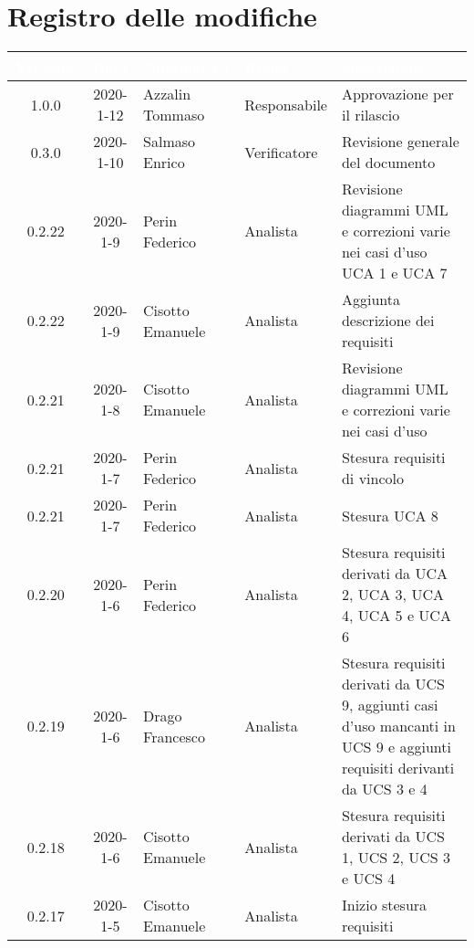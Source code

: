\section*{Registro delle modifiche}
{
\renewcommand{\arraystretch}{1.5}
\centering
\begin{longtable}{ c c  C{4cm}  C{3cm} C{4cm}}
   \textcolor{white}{\textbf{Versione}} &
   \textcolor{white}{\textbf{Data}}&
   \textcolor{white}{\textbf{Nominativo}}&
   \textcolor{white}{\textbf{Ruolo}}&
   \textcolor{white}{\textbf{Descrizione}}\\
   \endhead


1.0.0 & 2020-1-12 & Azzalin Tommaso & Responsabile & Approvazione per il rilascio \\

0.3.0 & 2020-1-10 & Salmaso Enrico & Verificatore & Revisione generale del documento\\

0.2.22 & 2020-1-9 & Perin Federico & Analista & Revisione diagrammi UML e correzioni varie nei casi d'uso UCA 1 e UCA 7 \\

0.2.22 & 2020-1-9 & Cisotto Emanuele & Analista & Aggiunta descrizione dei requisiti \\

0.2.21 & 2020-1-8 & Cisotto Emanuele & Analista & Revisione diagrammi UML e correzioni varie nei casi d'uso \\

0.2.21 & 2020-1-7 & Perin Federico & Analista & Stesura requisiti di vincolo\\

0.2.21 & 2020-1-7 & Perin Federico & Analista & Stesura UCA 8\\

0.2.20 & 2020-1-6 & Perin Federico & Analista & Stesura requisiti derivati da UCA 2, UCA 3, UCA 4, UCA 5 e UCA 6\\

0.2.19 & 2020-1-6 & Drago Francesco & Analista & Stesura requisiti derivati da UCS 9, aggiunti casi d'uso mancanti in UCS 9 e aggiunti requisiti derivanti da UCS 3 e 4 \\

0.2.18 & 2020-1-6 & Cisotto Emanuele & Analista & Stesura requisiti derivati da UCS 1, UCS 2, UCS 3 e UCS 4 \\

0.2.17 & 2020-1-5 & Cisotto Emanuele & Analista & Inizio stesura requisiti \\


\end{longtable}}
